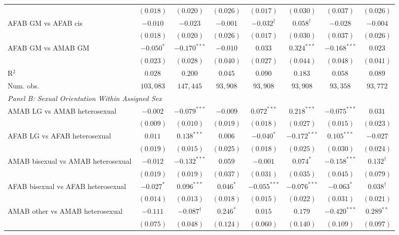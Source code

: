 \begin{table}[htpb!]
{\begin{tabular}{l c c c c c c c}
 & $(0.018)$ & $(0.020)$ & $(0.026)$ & $(0.017)$ & $(0.030)$ & $(0.037)$ & $(0.026)$ \\
AFAB GM vs AFAB cis & $-0.010$ & $-0.023$ & $-0.001$ & $-0.032^{\dagger}$ & $0.058^{\dagger}$ & $-0.028$ & $-0.004$ \\
 & $(0.018)$ & $(0.020)$ & $(0.026)$ & $(0.017)$ & $(0.030)$ & $(0.037)$ & $(0.026)$ \\
AFAB GM vs AMAB GM & $-0.050^{*}$ & $-0.170^{***}$ & $-0.010$ & $0.033$ & $0.324^{***}$ & $-0.168^{***}$ & $0.023$ \\
 & $(0.023)$ & $(0.028)$ & $(0.040)$ & $(0.027)$ & $(0.044)$ & $(0.048)$ & $(0.041)$ \\
\hline
R$^2$ & $0.028$ & $0.200$ & $0.045$ & $0.090$ & $0.183$ & $0.058$ & $0.089$ \\
Num. obs. & $103,083$ & $147,445$ & $93,908$ & $93,908$ & $93,908$ & $93,358$ & $93,772$ \\
\hline
\multicolumn{8}{l}{\textit{Panel B: Sexual Orientation Within Assigned Sex}} \\
AMAB LG vs AMAB heterosexual & $-0.002$ & $-0.079^{***}$ & $-0.009$ & $0.072^{***}$ & $0.218^{***}$ & $-0.075^{***}$ & $0.031$ \\
 & $(0.009)$ & $(0.010)$ & $(0.019)$ & $(0.018)$ & $(0.027)$ & $(0.015)$ & $(0.023)$ \\
AFAB LG vs AFAB heterosexual & $0.011$ & $0.138^{***}$ & $0.006$ & $-0.040^{*}$ & $-0.172^{***}$ & $0.105^{***}$ & $-0.027$ \\
 & $(0.019)$ & $(0.015)$ & $(0.025)$ & $(0.018)$ & $(0.025)$ & $(0.030)$ & $(0.024)$ \\
AMAB bisexual vs AMAB heterosexual & $-0.012$ & $-0.132^{***}$ & $0.059$ & $-0.001$ & $0.074^{*}$ & $-0.158^{***}$ & $0.132^{\dagger}$ \\
 & $(0.019)$ & $(0.019)$ & $(0.037)$ & $(0.031)$ & $(0.035)$ & $(0.045)$ & $(0.079)$ \\
AFAB bisexual vs AFAB heterosexual & $-0.027^{*}$ & $0.096^{***}$ & $0.046^{*}$ & $-0.055^{***}$ & $-0.076^{***}$ & $-0.063^{*}$ & $0.038^{\dagger}$ \\
 & $(0.014)$ & $(0.013)$ & $(0.018)$ & $(0.015)$ & $(0.022)$ & $(0.031)$ & $(0.021)$ \\
AMAB other vs AMAB heterosexual & $-0.111$ & $-0.087^{\dagger}$ & $0.246^{*}$ & $0.015$ & $0.179$ & $-0.420^{***}$ & $0.289^{**}$ \\
 & $(0.075)$ & $(0.048)$ & $(0.124)$ & $(0.060)$ & $(0.140)$ & $(0.109)$ & $(0.097)$ \\

\end{tabular}}
\end{table}

